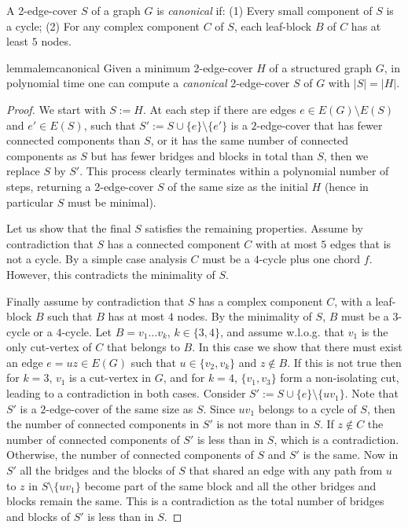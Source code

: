 \documentclass{theoretics}
\begin{document}
\begin{definition}
A 2-edge-cover $S$ of a graph $G$ is \emph{canonical} if: (1) Every small component of $S$ is a cycle; (2) For any complex component $C$ of $S$, each leaf-block $B$ of $C$ has at least $5$ nodes.
\end{definition}
\begin{restatable}{lemma}{lemcanonical}\label{lem:canonical}
Given a minimum 2-edge-cover $H$ of a structured graph $G$, in  polynomial time one can compute a \emph{canonical} 2-edge-cover $S$ of $G$ with $|S|=|H|$. 
\end{restatable}
\begin{proof}
We start with $S:=H$. At each step if there are edges $e\in E(G)\setminus E(S)$ and  $e'\in E(S)$, such that $S':=S\cup \{e\}\setminus\{e'\}$ is a $2$-edge-cover that has fewer connected components than $S$, or it has the same number of connected components as $S$ but has fewer bridges and blocks in total than $S$, then we replace $S$ by $S'$. This process clearly terminates within a polynomial number of steps, returning a 2-edge-cover $S$ of the same size as the initial $H$ (hence in particular $S$ must be minimal).

Let us show that the final $S$ satisfies the remaining properties. Assume by contradiction that $S$ has a connected component $C$ with at most $5$ edges that is not a cycle. By a simple case analysis $C$ must be a $4$-cycle plus one chord $f$. However, this contradicts the minimality of $S$.

Finally assume by contradiction that $S$ has a complex component $C$, with a leaf-block $B$ such that $B$ has at most $4$ nodes. By the minimality of $S$, $B$ must be a $3$-cycle or a $4$-cycle. Let $B=v_1\ldots v_k$, $k\in \{3,4\}$, and assume w.l.o.g. that $v_1$ is the only cut-vertex of $C$ that belongs to $B$. In this case we show that there must exist an edge $e=uz\in E(G)$ such that $u\in \{v_2,v_k\}$ and $z\notin B$. If this is not true then for $k=3$, $v_1$ is a cut-vertex in $G$, and for $k=4$, $\{v_1,v_3\}$ form a non-isolating cut, leading to a contradiction in both cases.  Consider $S':=S\cup \{e\}\setminus\{uv_1\}$. Note that $S'$ is a $2$-edge-cover of the same size as $S$. Since $uv_1$ belongs to a cycle of $S$, then the number of connected components in $S'$ is not more than in $S$. If $z\notin C$ the number of connected components of $S'$ is less than in $S$, which is a contradiction. Otherwise, the number of connected components of $S$ and $S'$ is the same. Now in $S'$ all the bridges and the blocks of $S$ that shared an edge with any path from $u$ to $z$ in $S\setminus\{uv_1\}$ become part of the same block and all the other bridges and blocks remain the same. This is a contradiction as the total number of bridges and blocks of $S'$ is less than in $S$. 
\end{proof}
\end{document}
